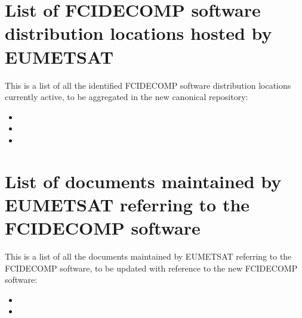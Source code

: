 \documentclass[a4paper,10pt,english]{sphinxmanual}
\begin{document}
\section{List of FCIDECOMP software distribution locations hosted by EUMETSAT}
\label{\detokenize{a_users_using_fcidecomp:list-of-fcidecomp-software-distribution-locations-hosted-by-eumetsat}}\label{\detokenize{a_users_using_fcidecomp:fcidecomp-distribution-locations}}
\sphinxAtStartPar
This is a list of all the identified FCIDECOMP software distribution locations currently active, to be aggregated in the
new canonical repository:
\begin{itemize}
\item {} 
\sphinxAtStartPar
{}

\item {} 
\sphinxAtStartPar
{}

\item {} 
\sphinxAtStartPar
{}

\end{itemize}


\section{List of documents maintained by EUMETSAT referring to the FCIDECOMP software}
\label{\detokenize{a_users_using_fcidecomp:list-of-documents-maintained-by-eumetsat-referring-to-the-fcidecomp-software}}\label{\detokenize{a_users_using_fcidecomp:fcidecomp-documentation}}
\sphinxAtStartPar
This is a list of all the documents maintained by EUMETSAT referring to the FCIDECOMP software, to be updated with
reference to the new FCIDECOMP software:
\begin{itemize}
\item {} 
\sphinxAtStartPar
{}

\item {} 
\sphinxAtStartPar
{}

\end{itemize}
\end{document}
